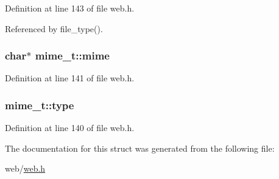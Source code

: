 Definition at line 143 of file web.\-h.



Referenced by file\-\_\-type().

\hypertarget{structmime__t_ad796d16eaee60d7435bff66b2e9b8a8d}{
\subsubsection[{mime}]{\setlength{\rightskip}{0pt plus 5cm}char$\ast$ mime\-\_\-t\-::mime}}\label{structmime__t_ad796d16eaee60d7435bff66b2e9b8a8d}


Definition at line 141 of file web.\-h.

\hypertarget{structmime__t_ae69826dcfd475d65fa0fe8a1574bb3af}{
\subsubsection[{type}]{ mime\-\_\-t\-::type}}\label{structmime__t_ae69826dcfd475d65fa0fe8a1574bb3af}


Definition at line 140 of file web.\-h.



The documentation for this struct was generated from the following file\-:\begin{DoxyCompactItemize}
\item 
web/\hyperlink{web_8h}{web.\-h}\end{DoxyCompactItemize}
